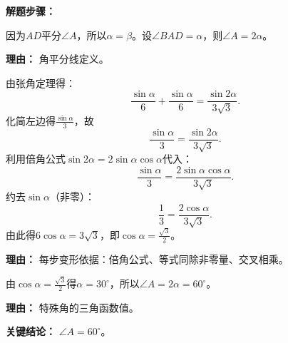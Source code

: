 \begin{examplebox}
	\textbf{\textcolor{CExample}{解题步骤：}}
	\begin{description}[style=nextline, leftmargin=2.8em, labelsep=0.5em, itemsep=0.45em]
		\item[\textbf{第一步(分析角平分条件):}] 因为$AD$平分$\angle A$，所以$\alpha=\beta$。设$\angle BAD=\alpha$，则$\angle A=2\alpha$。
			\par\textbf{理由：} 角平分线定义。
		\item[\textbf{第二步(应用张角定理化简):}] 由张角定理得：
			\[
				\frac{\sin\alpha}{6}+\frac{\sin\alpha}{6}=\frac{\sin2\alpha}{3\sqrt3}.
			\]
			化简左边得$\frac{\sin\alpha}{3}$，故
			\[
				\frac{\sin\alpha}{3} = \frac{\sin2\alpha}{3\sqrt3}.
			\]
			利用倍角公式$\sin2\alpha=2\sin\alpha\cos\alpha$代入：
			\[
				\frac{\sin\alpha}{3} = \frac{2\sin\alpha\cos\alpha}{3\sqrt3}.
			\]
			约去$\sin\alpha$（非零）：
			\[
				\frac13 = \frac{2\cos\alpha}{3\sqrt3}.
			\]
			由此得$6\cos\alpha=3\sqrt3$，即$\cos\alpha=\frac{\sqrt3}{2}$。
			\par\textbf{理由：} 每步变形依据：倍角公式、等式同除非零量、交叉相乘。
		\item[\textbf{第三步(求角):}] 由$\cos\alpha=\frac{\sqrt3}{2}$得$\alpha=30^\circ$，所以$\angle A=2\alpha=60^\circ$。
			\par\textbf{理由：} 特殊角的三角函数值。
	\end{description}

	\textbf{\textcolor{CExample}{关键结论：}}
	$\angle A=60^\circ$。
\end{examplebox}
